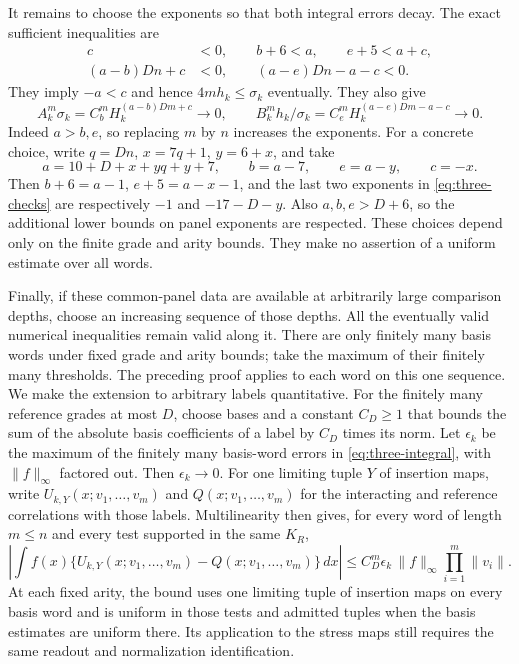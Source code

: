 It remains to choose the exponents so that both integral errors decay.
The exact sufficient inequalities are
\begin{equation}\label{eq:three-checks}
 \begin{split}
 c&<0,\qquad b+6<a,\qquad e+5<a+c,\\
 (a-b)Dn+c&<0,\qquad (a-e)Dn-a-c<0.
 \end{split}
\end{equation}
They imply $-a<c$ and hence $4m h_k\le\sigma_k$ eventually.
They also give
\[
 A_k^m\sigma_k=C_b^mH_k^{(a-b)Dm+c}\to0,\qquad
 B_k^m h_k/\sigma_k=C_e^mH_k^{(a-e)Dm-a-c}\to0.
\]
Indeed $a>b,e$, so replacing $m$ by $n$ increases the exponents.
For a concrete choice, write $q=Dn$, $x=7q+1$, $y=6+x$, and take
\[
 a=10+D+x+yq+y+7,\qquad b=a-7,\qquad e=a-y,\qquad c=-x.
\]
Then $b+6=a-1$, $e+5=a-x-1$, and the last two exponents in
\eqref{eq:three-checks} are respectively $-1$ and $-17-D-y$.
Also $a,b,e>D+6$, so the additional lower bounds on panel exponents
are respected. These choices depend only on the finite grade and arity
bounds. They make no assertion of a uniform estimate over all words.

Finally, if these common-panel data are available at arbitrarily large
comparison depths, choose an increasing sequence of those depths.
All the eventually valid numerical inequalities remain valid along it.
There are only finitely many basis words under fixed grade and arity
bounds; take the maximum of their finitely many thresholds. The preceding
proof applies to each word on this one sequence. We make the extension to
arbitrary labels quantitative. For the finitely many reference grades at
most $D$, choose bases and a constant $C_D\ge1$ that bounds the sum of the
absolute basis coefficients of a label by $C_D$ times its norm. Let
$\epsilon_k$ be the maximum of the finitely many basis-word errors in
\eqref{eq:three-integral}, with $\|f\|_\infty$ factored out. Then
$\epsilon_k\to0$. For one limiting tuple $Y$ of insertion maps, write
$U_{k,Y}(x;v_1,\ldots,v_m)$ and $Q(x;v_1,\ldots,v_m)$ for the
interacting and reference correlations with those labels. Multilinearity
then gives, for every word of length $m\le n$ and every test supported in
the same $K_R$,
\[
 \left|\int f(x)\{U_{k,Y}(x;v_1,\ldots,v_m)-Q(x;v_1,\ldots,v_m)\}\,dx\right|
 \le C_D^m\epsilon_k\,\|f\|_\infty\prod_{i=1}^m\|v_i\|.
\]
At each fixed arity, the bound uses one limiting tuple of insertion maps
on every basis word and is uniform in those tests and admitted tuples when
the basis estimates are uniform there. Its application to the stress
maps still requires the same readout and normalization identification.

